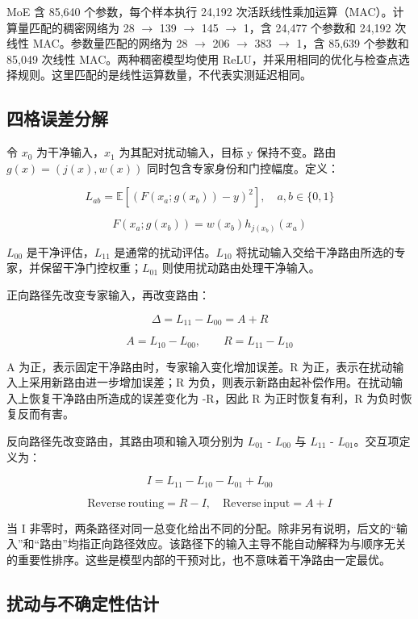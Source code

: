 \documentclass[10pt,letterpaper]{article}
\begin{document}
MoE 含 85,640 个参数，每个样本执行 24,192 次活跃线性乘加运算（MAC）。计算量匹配的稠密网络为 28 \ensuremath{\rightarrow} 139 \ensuremath{\rightarrow} 145 \ensuremath{\rightarrow} 1，含 24,477 个参数和 24,192 次线性 MAC。参数量匹配的网络为 28 \ensuremath{\rightarrow} 206 \ensuremath{\rightarrow} 383 \ensuremath{\rightarrow} 1，含 85,639 个参数和 85,049 次线性 MAC。两种稠密模型均使用 ReLU，并采用相同的优化与检查点选择规则。这里匹配的是线性运算数量，不代表实测延迟相同。


\subsection{四格误差分解}

令 $x_{0}$ 为干净输入，$x_{1}$ 为其配对扰动输入，目标 y 保持不变。路由 $g(x)=(j(x),w(x))$ 同时包含专家身份和门控幅度。定义：


\[
L_{ab}=\mathbb{E}[(F(x_a;g(x_b))-y)^2],\quad a,b\in\{0,1\}
\]

\[
F(x_a;g(x_b))=w(x_b)h_{j(x_b)}(x_a)
\]

$L_{00}$ 是干净评估，$L_{11}$ 是通常的扰动评估。$L_{10}$ 将扰动输入交给干净路由所选的专家，并保留干净门控权重；$L_{01}$ 则使用扰动路由处理干净输入。


正向路径先改变专家输入，再改变路由：


\[
\Delta=L_{11}-L_{00}=A+R
\]

\[
A=L_{10}-L_{00},\qquad R=L_{11}-L_{10}
\]

A 为正，表示固定干净路由时，专家输入变化增加误差。R 为正，表示在扰动输入上采用新路由进一步增加误差；R 为负，则表示新路由起补偿作用。在扰动输入上恢复干净路由所造成的误差变化为 -R，因此 R 为正时恢复有利，R 为负时恢复反而有害。


反向路径先改变路由，其路由项和输入项分别为 $L_{01}$ - $L_{00}$ 与 $L_{11}$ - $L_{01}$。交互项定义为：


\[
I=L_{11}-L_{10}-L_{01}+L_{00}
\]

\[
\mathrm{Reverse\ routing}=R-I,\quad\mathrm{Reverse\ input}=A+I
\]

当 I 非零时，两条路径对同一总变化给出不同的分配。除非另有说明，后文的``输入''和``路由''均指正向路径效应。该路径下的输入主导不能自动解释为与顺序无关的重要性排序。这些是模型内部的干预对比，也不意味着干净路由一定最优。


\subsection{扰动与不确定性估计}
\end{document}
